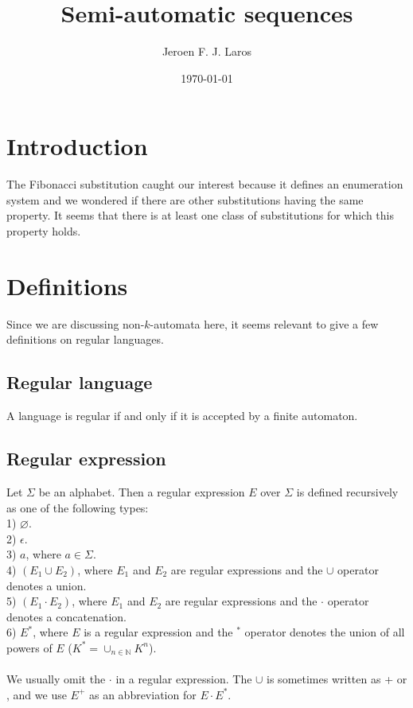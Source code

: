\documentclass{article}
\title{\Huge{Semi-automatic sequences}}
\author{Jeroen F. J. Laros}
\date{\today}
\begin{document}
\newcommand{\qed}{$\blacksquare$}
\newcommand{\monoit}[1]{\texttt{\textit{#1}}}
\newcommand{\spaces}{\;\;\;\;\;\;\;\;\;\;\;\;\;\;\;\;\;\;\;\;\;\;\;\;\;\;\;\;\;
\;\;\;\;\;\;\;\;\;\;\;\;\;\;\;\;\;\;\;\;\;\;\;\;\;\;\;\;\;\;\;\;\;\;\;\;\;\;\;
\;\;\;\;\;\;\;\;\;\;\;\;\;\;\;\;\;\;\;\;\;\;\;\;\;\;}

\maketitle
\newpage

\tableofcontents
\newpage

\section{Introduction}
The Fibonacci substitution caught our interest because it defines an 
enumeration system and we wondered if there are other substitutions having the
same property. It seems that there is at least one class of substitutions
for which this property holds.

\section{Definitions}
Since we are discussing non-$k$-automata here, it seems relevant to give a
few definitions on regular languages.

\subsection{Regular language}
A language is regular if and only if it is accepted by a finite automaton.

\subsection{Regular expression}
Let $\Sigma$ be an alphabet. Then a regular expression $E$ over $\Sigma$ is
defined recursively as one of the following types:\\
1) $\varnothing$.\\
2) $\epsilon$.\\
3) $a$, where $a \in \Sigma$.\\
4) $(E_1 \cup E_2)$, where $E_1$ and $E_2$ are regular expressions and the
$\cup$ operator denotes a union.\\
5) $(E_1 \cdot E_2)$, where $E_1$ and $E_2$ are regular expressions and the
$\cdot$ operator denotes a concatenation.\\
6) $E^*$, where $E$ is a regular expression and the $^*$ operator denotes the
union of all powers of $E$ ($K^* = \cup_{n \in \mathbb{N}}K^n$).\\
\\
We usually omit the $\cdot$ in a regular expression. The $\cup$ is sometimes
written as + or , and we use $E^+$ as an abbreviation for $E \cdot E^*$.
\end{document}
